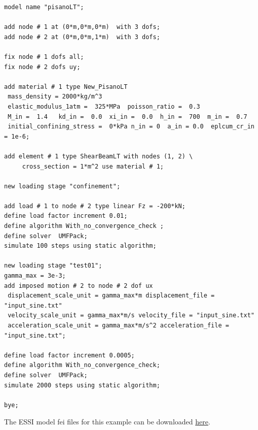 \documentclass[fleqn,11pt]{article}
\begin{document}
%
\begin{lstlisting}
model name "pisanoLT";

add node # 1 at (0*m,0*m,0*m)  with 3 dofs;
add node # 2 at (0*m,0*m,1*m)  with 3 dofs;

fix node # 1 dofs all;
fix node # 2 dofs uy;

add material # 1 type New_PisanoLT
 mass_density = 2000*kg/m^3
 elastic_modulus_1atm =  325*MPa  poisson_ratio =  0.3
 M_in =  1.4   kd_in =  0.0  xi_in =  0.0  h_in =  700  m_in =  0.7
 initial_confining_stress =  0*kPa n_in = 0  a_in = 0.0  eplcum_cr_in = 1e-6;

add element # 1 type ShearBeamLT with nodes (1, 2) \
     cross_section = 1*m^2 use material # 1;

new loading stage "confinement";

add load # 1 to node # 2 type linear Fz = -200*kN;
define load factor increment 0.01;
define algorithm With_no_convergence_check ;
define solver  UMFPack;
simulate 100 steps using static algorithm;

new loading stage "test01";
gamma_max = 3e-3;
add imposed motion # 2 to node # 2 dof ux
 displacement_scale_unit = gamma_max*m displacement_file = "input_sine.txt"
 velocity_scale_unit = gamma_max*m/s velocity_file = "input_sine.txt"
 acceleration_scale_unit = gamma_max*m/s^2 acceleration_file = "input_sine.txt";

define load factor increment 0.0005;
define algorithm With_no_convergence_check;
define solver  UMFPack;
simulate 2000 steps using static algorithm;

bye;
\end{lstlisting}

The    ESSI   model   fei   files   for   this   example   can   be   downloaded
\href{https://github.com/BorisJeremic/Real-ESSI-Examples/blob/master/model_fei_file/shearbeam_pisano_plastic/shearbeam_pisano_plastic.tgz?raw=true}{here}.


























\end{document}
